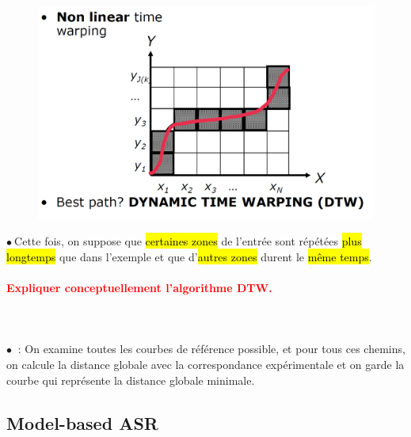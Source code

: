 \documentclass[letterpaper, 12pt]{article}
\newcommand{\alinea}{
\hspace*{0.3cm}}
\newcommand{\red}[1]{
	\textcolor{red}{#1}
}
\newcommand{\myul}[1]{
	\underline{\smash{#1}}
}
\newcommand{\point}{$\bullet\ $}
\begin{document}
			\begin{minipage}{0.55\textwidth}
				\begin{figure}[H]
					\centering
					\includegraphics[scale=0.25]{Images/nonlinear_time_wrapping}
				\end{figure}\noindent
			\end{minipage}\hfill
			\begin{minipage}{0.4\textwidth}
				\point Cette fois, on suppose que \hl{certaines zones} de l'entrée sont répétées \hl{plus longtemps}
					que dans l'exemple et que d'\hl{autres zones} durent le \hl{m\^eme temps}.
			\end{minipage}
		
		\paragraph{\red{Expliquer conceptuellement l'algorithme DTW.}}~\\~\\
			\point \myul{DTW} : On examine toutes les courbes de référence possible, et pour tous ces chemins,
				\\\alinea on calcule la distance globale avec la correspondance expérimentale et on garde la 
				\\\alinea courbe qui représente la distance globale minimale.
		
	\subsection{Model-based ASR}
\end{document}
